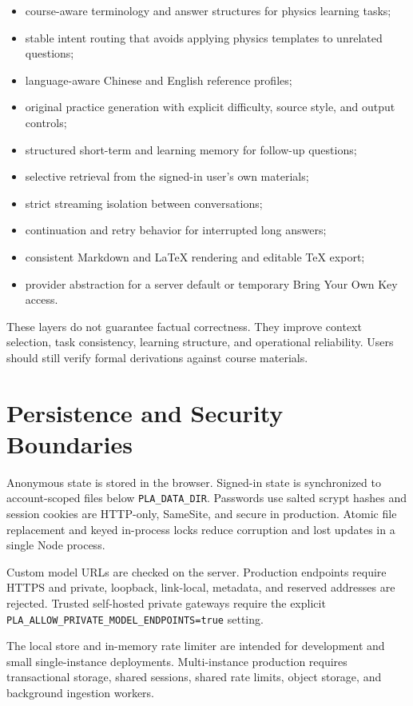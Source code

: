 \documentclass[a4paper,11pt]{article}
\begin{document}
\begin{itemize}[leftmargin=2em]
  \item course-aware terminology and answer structures for physics learning tasks;
  \item stable intent routing that avoids applying physics templates to unrelated questions;
  \item language-aware Chinese and English reference profiles;
  \item original practice generation with explicit difficulty, source style, and output controls;
  \item structured short-term and learning memory for follow-up questions;
  \item selective retrieval from the signed-in user's own materials;
  \item strict streaming isolation between conversations;
  \item continuation and retry behavior for interrupted long answers;
  \item consistent Markdown and LaTeX rendering and editable TeX export;
  \item provider abstraction for a server default or temporary Bring Your Own Key access.
\end{itemize}

These layers do not guarantee factual correctness. They improve context selection, task consistency, learning structure, and operational reliability. Users should still verify formal derivations against course materials.

\section{Persistence and Security Boundaries}

Anonymous state is stored in the browser. Signed-in state is synchronized to account-scoped files below \texttt{PLA\_DATA\_DIR}. Passwords use salted scrypt hashes and session cookies are HTTP-only, SameSite, and secure in production. Atomic file replacement and keyed in-process locks reduce corruption and lost updates in a single Node process.

Custom model URLs are checked on the server. Production endpoints require HTTPS and private, loopback, link-local, metadata, and reserved addresses are rejected. Trusted self-hosted private gateways require the explicit \texttt{PLA\_ALLOW\_PRIVATE\_MODEL\_ENDPOINTS=true} setting.

The local store and in-memory rate limiter are intended for development and small single-instance deployments. Multi-instance production requires transactional storage, shared sessions, shared rate limits, object storage, and background ingestion workers.
\end{document}
